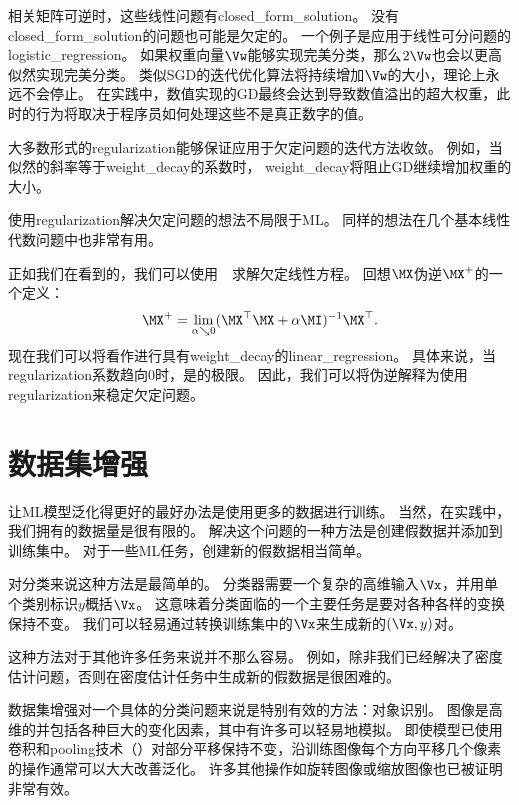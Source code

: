相关矩阵可逆时，这些线性问题有\gls{closed_form_solution}。
没有\gls{closed_form_solution}的问题也可能是欠定的。
一个例子是应用于线性可分问题的\gls{logistic_regression}。
如果权重向量$\Vw$能够实现完美分类，那么$2 \Vw$也会以更高似然实现完美分类。
类似\gls{SGD}的迭代优化算法将持续增加$\Vw$的大小，理论上永远不会停止。
在实践中，数值实现的\gls{GD}最终会达到导致数值溢出的超大权重，此时的行为将取决于程序员如何处理这些不是真正数字的值。

大多数形式的\gls{regularization}能够保证应用于欠定问题的迭代方法收敛。
例如，当似然的斜率等于\gls{weight_decay}的系数时， \gls{weight_decay}将阻止\gls{GD}继续增加权重的大小。

使用\gls{regularization}解决欠定问题的想法不局限于\gls{ML}。
同样的想法在几个基本线性代数问题中也非常有用。


正如我们在看到的，我们可以使用~~求解欠定线性方程。 
回想$\MX$伪逆$\MX^+$的一个定义：
\begin{align} 
\label{eq:729pseudo}
 \MX^+ = \lim_{\alpha \searrow 0} (\MX^\top \MX + \alpha \MI)^{-1}\MX^\top.
\end{align}
现在我们可以将看作进行具有\gls{weight_decay}的\gls{linear_regression}。
具体来说，当\gls{regularization}系数趋向0时，是的极限。
因此，我们可以将伪逆解释为使用\gls{regularization}来稳定欠定问题。


\section{数据集增强}
\label{sec:dataset_augmentation_chap7}
让\gls{ML}模型泛化得更好的最好办法是使用更多的数据进行训练。
当然，在实践中，我们拥有的数据量是很有限的。
解决这个问题的一种方法是创建假数据并添加到训练集中。
对于一些\gls{ML}任务，创建新的假数据相当简单。

对分类来说这种方法是最简单的。
分类器需要一个复杂的高维输入$\Vx$，并用单个类别标识$y$概括$\Vx$。
这意味着分类面临的一个主要任务是要对各种各样的变换保持不变。
我们可以轻易通过转换训练集中的$\Vx$来生成新的$(\Vx, y)$对。

这种方法对于其他许多任务来说并不那么容易。
例如，除非我们已经解决了密度估计问题，否则在密度估计任务中生成新的假数据是很困难的。

数据集增强对一个具体的分类问题来说是特别有效的方法：对象识别。
图像是高维的并包括各种巨大的变化因素，其中有许多可以轻易地模拟。
即使模型已使用卷积和\gls{pooling}技术（）对部分平移保持不变，沿训练图像每个方向平移几个像素的操作通常可以大大改善泛化。
许多其他操作如旋转图像或缩放图像也已被证明非常有效。

